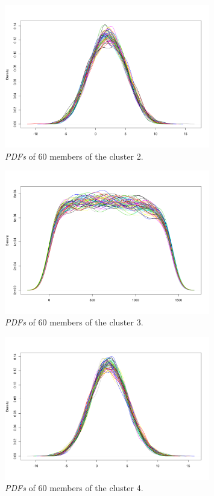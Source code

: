 \begin{figure}[H]
    \centering
    \includegraphics[width=0.8\textwidth]{images/cluster2.png}
    \caption{\textit{PDFs} of 60 members of the cluster 2.}
    \label{fig:cluster2}
\end{figure}

\begin{figure}[H]
    \centering
    \includegraphics[width=0.8\textwidth]{images/cluster3.png}
    \caption{\textit{PDFs} of 60 members of the cluster 3.}
    \label{fig:cluster3}
\end{figure}

\begin{figure}[H]
    \centering
    \includegraphics[width=0.8\textwidth]{images/cluster4.png}
    \caption{\textit{PDFs} of 60 members of the cluster 4.}
    \label{fig:cluster4}
\end{figure}

